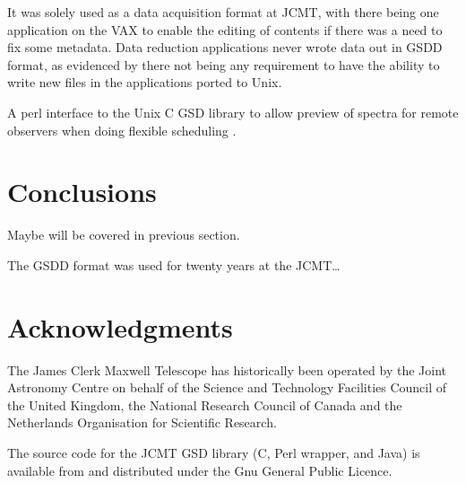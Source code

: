 \documentclass[final,authoryear,5p,times,twocolumn]{elsarticle}
\begin{document}
It was solely used as a data acquisition format at JCMT, with there
being one application on the VAX to enable the editing of contents if
there was a need to fix some metadata. Data reduction applications
never wrote data out in GSDD format, as evidenced by there not being
any requirement to have the ability to write new files in the
applications ported to Unix.

{\color{red}
A perl interface to the Unix C GSD library to allow preview of spectra
for remote observers when doing flexible scheduling
\citep{1997ASPC..125..401J}.
}




\section{Conclusions}

{\color{red}
Maybe will be covered in previous section.
}

The GSDD format was used for twenty years at the JCMT\ldots

\section*{Acknowledgments}

The James Clerk Maxwell Telescope has historically been operated by
the Joint Astronomy Centre on behalf of the Science and Technology
Facilities Council of the United Kingdom, the National Research
Council of Canada and the Netherlands Organisation for Scientific
Research.

The source code for the JCMT GSD library (C, Perl wrapper, and Java)
is available from
and distributed under the Gnu General Public Licence.
\end{document}
